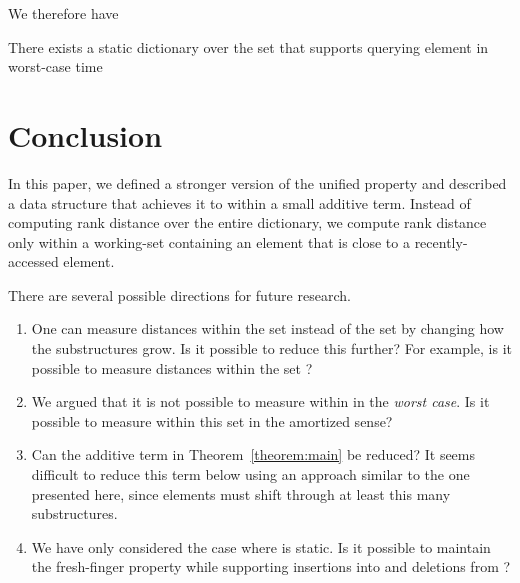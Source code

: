 \documentclass{llncs}
\begin{document}
We therefore have

\begin{theorem}
\label{theorem:main}
There exists a static dictionary over the set  that supports querying element  in worst-case time

\end{theorem}
	
\section{Conclusion}
\label{section:conclusion}

In this paper, we defined a stronger version of the unified property and described a data structure that achieves it to within a small additive term. Instead of computing rank distance over the entire dictionary, we compute rank distance only within a working-set containing an element that is close to a recently-accessed element.

There are several possible directions for future research.

\begin{enumerate}
\item One can measure distances within the set  instead of the set  by changing how the substructures grow. Is it possible to reduce this further? For example, is it possible to measure distances within the set ?

\item We argued that it is not possible to measure within  in the \emph{worst case}. Is it possible to measure within this set in the amortized sense?

\item Can the additive term in Theorem~\ref{theorem:main} be reduced? It seems difficult to reduce this term below  using an approach similar to the one presented here, since elements must shift through at least this many substructures.

\item We have only considered the case where  is static. Is it possible to maintain the fresh-finger property while supporting insertions into and deletions from ?
\end{enumerate}





\end{document}
